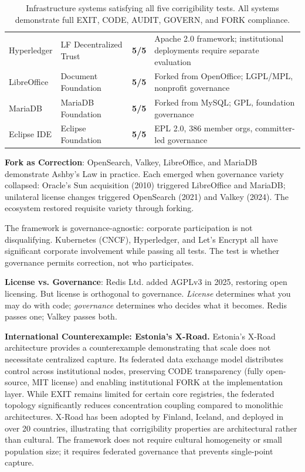 \documentclass{article}
\begin{document}
\begin{table}[htbp]
\begin{tabular}{@{}l>{\raggedright}p{3.2cm}>{\centering\arraybackslash}p{1.2cm}p{5.8cm}@{}}
\rowcolor{green!8}
Hyperledger & LF Decentralized Trust & \textbf{5/5} & Apache 2.0 framework; institutional deployments require separate evaluation \\
LibreOffice & Document Foundation & \textbf{5/5} & Forked from OpenOffice; LGPL/MPL, nonprofit governance \\
\rowcolor{green!8}
MariaDB & MariaDB Foundation & \textbf{5/5} & Forked from MySQL; GPL, foundation governance \\
Eclipse IDE & Eclipse Foundation & \textbf{5/5} & EPL 2.0, 386 member orgs, committer-led governance \\
\bottomrule
\end{tabular}
\caption{Infrastructure systems satisfying all five corrigibility tests. All systems demonstrate full EXIT, CODE, AUDIT, GOVERN, and FORK compliance.}
\label{tab:positive}
\end{table}

\textbf{Fork as Correction}: OpenSearch, Valkey, LibreOffice, and MariaDB demonstrate Ashby's Law in practice. Each emerged when governance variety collapsed: Oracle's Sun acquisition (2010) triggered LibreOffice and MariaDB; unilateral license changes triggered OpenSearch (2021) and Valkey (2024). The ecosystem restored requisite variety through forking.

The framework is governance-agnostic: corporate participation is not disqualifying. Kubernetes (CNCF), Hyperledger, and Let's Encrypt all have significant corporate involvement while passing all tests. The test is whether governance permits correction, not who participates.

\textbf{License vs. Governance}: Redis Ltd. added AGPLv3 in 2025, restoring open licensing. But license is orthogonal to governance. \textit{License} determines what you may do with code; \textit{governance} determines who decides what it becomes. Redis passes one; Valkey passes both.

\textbf{International Counterexample: Estonia's X-Road.} Estonia's X-Road architecture provides a counterexample demonstrating that scale does not necessitate centralized capture. Its federated data exchange model distributes control across institutional nodes, preserving CODE transparency (fully open-source, MIT license) and enabling institutional FORK at the implementation layer. While EXIT remains limited for certain core registries, the federated topology significantly reduces concentration coupling compared to monolithic architectures. X-Road has been adopted by Finland, Iceland, and deployed in over 20 countries, illustrating that corrigibility properties are architectural rather than cultural. The framework does not require cultural homogeneity or small population size; it requires federated governance that prevents single-point capture.
\end{document}
